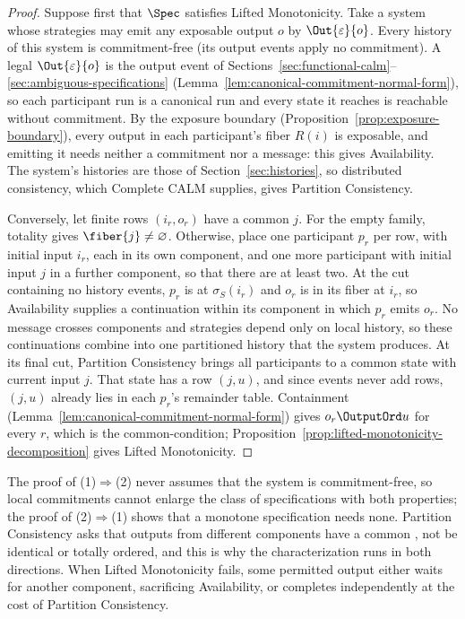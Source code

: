 \begin{proof}
Suppose first that $\Spec$ satisfies Lifted Monotonicity.  Take a system whose
strategies may emit any exposable output $o$ by $\Out{\varepsilon}{o}$.  Every
history of this system is commitment-free (its output events apply no
commitment).  A legal $\Out{\varepsilon}{o}$ is the output event of
Sections~\ref{sec:functional-calm}--\ref{sec:ambiguous-specifications}
(Lemma~\ref{lem:canonical-commitment-normal-form}), so each participant run is a
canonical run and every state it reaches is reachable without commitment.  By
the exposure boundary (Proposition~\ref{prop:exposure-boundary}), every output
in each participant's fiber $R(i)$ is exposable, and emitting it needs neither a
commitment nor a message: this gives Availability.  The system's histories are
those of Section~\ref{sec:histories}, so distributed consistency, which
Complete CALM supplies, gives Partition Consistency.

Conversely, let finite rows $(i_r,o_r)$ have a common \indesc $j$.  For the
empty family, totality gives $\fiber{j}\neq\varnothing$.  Otherwise, place one
participant $p_r$ per row, with initial input $i_r$, each in its own
component, and one more participant with initial input $j$ in a further
component, so that there are at least two.  At the cut containing no history events,
$p_r$ is at $\sigma_S(i_r)$ and $o_r$ is in its fiber at $i_r$, so Availability
supplies a continuation within its component in which $p_r$ emits $o_r$.  No
message crosses components and strategies depend only on local history, so
these continuations combine into one partitioned history that the system
produces.  At its final cut,
Partition Consistency brings all participants to a common state with current
input $j$.  That state has a row $(j,u)$, and since events never add rows,
$(j,u)$ already lies in each $p_r$'s remainder table.  Containment
(Lemma~\ref{lem:canonical-commitment-normal-form}) gives $o_r\OutputOrd u$ for
every $r$, which is the common-\indesc condition;
Proposition~\ref{prop:lifted-monotonicity-decomposition} gives Lifted
Monotonicity.
\end{proof}

The proof of (1)$\Rightarrow$(2) never assumes that the system is
commitment-free, so local commitments cannot enlarge the class of
specifications with both properties; the proof of (2)$\Rightarrow$(1) shows
that a monotone specification needs none.
Partition Consistency asks that outputs from different components have a
common \outnoun, not be identical or totally ordered, and this is why the
characterization runs in both directions.  When Lifted Monotonicity fails, some
permitted output either waits for another component, sacrificing Availability,
or completes independently at the cost of Partition Consistency.

